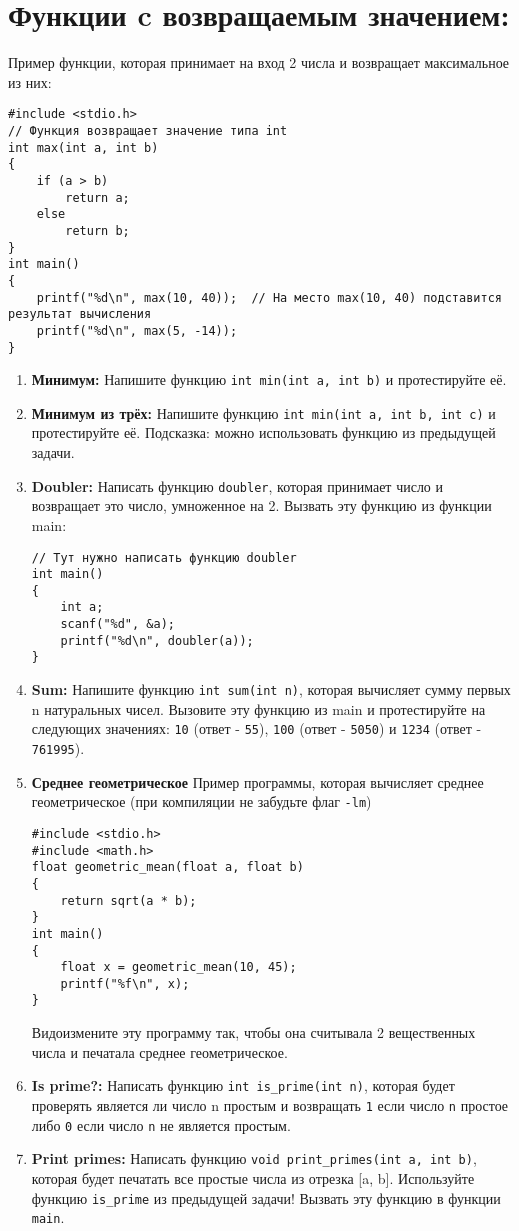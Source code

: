\documentclass{article}
\begin{document}
\section*{Функции c возвращаемым значением:}
Пример функции, которая принимает на вход 2 числа и возвращает максимальное из них:
\begin{lstlisting}
#include <stdio.h>
// Функция возвращает значение типа int
int max(int a, int b)
{
	if (a > b)
		return a;
	else
		return b;
}
int main()
{
	printf("%d\n", max(10, 40));  // На место max(10, 40) подставится результат вычисления
	printf("%d\n", max(5, -14));
}
\end{lstlisting}
\begin{enumerate}


\item \textbf{Минимум:} Напишите функцию \texttt{int min(int a, int b)} и протестируйте её.

\item \textbf{Минимум из трёх:} Напишите функцию \texttt{int min(int a, int b, int c)} и протестируйте её. Подсказка: можно использовать функцию из предыдущей задачи.

\item \textbf{Doubler:} Написать функцию \texttt{doubler}, которая принимает число и возвращает это число, умноженное на 2. Вызвать эту функцию из функции main:
\begin{lstlisting}
// Тут нужно написать функцию doubler
int main()
{
	int a;
	scanf("%d", &a);
	printf("%d\n", doubler(a));
}
\end{lstlisting}

\item \textbf{Sum:} Напишите функцию \texttt{int sum(int n)}, которая вычисляет сумму первых n натуральных чисел. Вызовите эту функцию из main и протестируйте на следующих значениях: \texttt{10} (ответ - \texttt{55}), \texttt{100} (ответ - \texttt{5050}) и \texttt{1234} (ответ - \texttt{761995}).

\newpage
\item \textbf{Среднее геометрическое}
Пример программы, которая вычисляет среднее геометрическое (при компиляции не забудьте флаг \texttt{-lm})
\begin{lstlisting}
#include <stdio.h>
#include <math.h>
float geometric_mean(float a, float b)
{
	return sqrt(a * b);
}
int main()
{
	float x = geometric_mean(10, 45);
	printf("%f\n", x);
}
\end{lstlisting}
Видоизмените эту программу так, чтобы она считывала 2 вещественных числа и печатала среднее геометрическое.




\item \textbf{Is prime?:} Написать функцию \texttt{int is\_prime(int n)}, которая будет проверять является ли число n простым и возвращать \texttt{1} если число \texttt{n} простое либо \texttt{0} если число \texttt{n} не является простым.
\item \textbf{Print primes:} Написать функцию \texttt{void print\_primes(int a, int b)}, которая будет печатать все простые числа из отрезка [a, b]. Используйте функцию \texttt{is\_prime} из предыдущей задачи! Вызвать эту функцию в функции \texttt{main}.
\end{enumerate}
\end{document}
